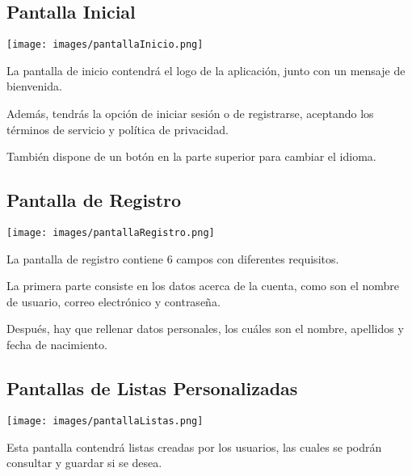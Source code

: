 \documentclass{article}
\begin{document}
\subsection{Pantalla Inicial}

    \begin{minipage}{0.4\textwidth}
        \texttt{[image: images/pantallaInicio.png]}
    \end{minipage}
    \hfill
    \begin{minipage}{0.55\textwidth}
    La pantalla de inicio contendrá el logo de la aplicación, junto con un mensaje de bienvenida.
    
    Además, tendrás la opción de iniciar sesión o de registrarse, aceptando los términos de servicio y política de privacidad.
    
    También dispone de un botón en la parte superior para cambiar el idioma.
    
    \end{minipage}

\subsection{Pantalla de Registro}

    \begin{minipage}{0.4\textwidth}
        \texttt{[image: images/pantallaRegistro.png]}
    \end{minipage}
    \hfill
    \begin{minipage}{0.55\textwidth}
    La pantalla de registro contiene 6 campos con diferentes requisitos.
    
    La primera parte consiste en los datos acerca de la cuenta, como son el nombre de usuario, correo electrónico y contraseña.
    
    Después, hay que rellenar datos personales, los cuáles son el nombre, apellidos y fecha de nacimiento.

    
    \end{minipage}

\subsection{Pantallas de Listas Personalizadas}

    \begin{minipage}{0.4\textwidth}
        \texttt{[image: images/pantallaListas.png]}
    \end{minipage}
    \begin{minipage}{0.55\textwidth}
    Esta pantalla contendrá listas creadas por los usuarios, las cuales se podrán consultar y guardar si se desea.
    
    \end{minipage}
    \hfill
\end{document}
